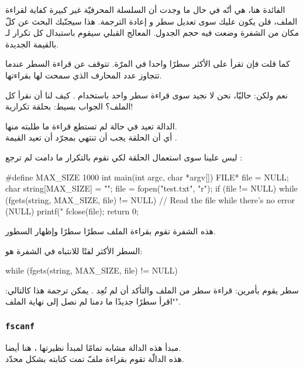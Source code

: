 الفائدة هنا، هي أنّه في حال ما وجدت أن السلسلة المحرفيّة غير كبيرة كفاية لقراءة الملف، فلن يكون عليك سوى تعديل سطر 
و إعادة الترجمة. هذا سيجنّبك البحث عن كلّ مكان من الشفرة وضعت فيه حجم الجدول. المعالج القبلي سيقوم باستبدال كل تكرار لـ
بالقيمة الجديدة.

كما قلت فإن
تقرأ على الأكثر سطرًا واحدا في المرّة. تتوقف عن قراءة السطر عندما تتجاوز عدد المحارف الذي سمحت لها بقراءتها.

نعم ولكن: حاليّا، نحن لا نجيد سوى قراءة سطر واحد باستخدام
.
كيف لنا أن نقرأ كل الملف؟ الجواب بسيط: بحلقة تكرارية!

الدالة
تعيد
في حالة لم تستطع قراءة ما طلبته منها.\\
أي أن الحلقة يجب أن تنتهي بمجرّد أن تعيد
القيمة
.

ليس علينا سوى استعمال الحلقة
لكي نقوم بالتكرار ما دامت
لم ترجع
:

\begin{Csource}
#define MAX_SIZE 1000
int main(int argc, char *argv[])
{
    FILE* file = NULL;
    char string[MAX_SIZE] = "";
    file = fopen("test.txt", "r");
    if (file != NULL)
    {
        while (fgets(string, MAX_SIZE, file) != NULL) // Read the file while there's no error (NULL)
        {
            printf("%
        }
        fclose(file);
    }
    return 0;
}
\end{Csource}

هذه الشفرة تقوم بقراءة الملف سطرًا سطرًا وإظهار السطور.

السطر الأكثر لفتًا للانتباه في الشفرة هو:

\begin{Csource}
while (fgets(string, MAX_SIZE, file) != NULL)
\end{Csource}

سطر 
يقوم بأمرين: قراءة سطر من الملف والتأكد أن
لم تُعِد
.
يمكن ترجمة هذا كالتالي: "اقرأ سطرًا جديدًا ما دمنا لم نصل إلى نهاية الملف".

\subsubsection{\texttt{fscanf}}

مبدأ هذه الدالة مشابه تمامًا لمبدأ نظيرتها
،
هنا أيضا.\\
هذه الدالّة تقوم بقراءة ملفّ تمت كتابته بشكل محدّد.

